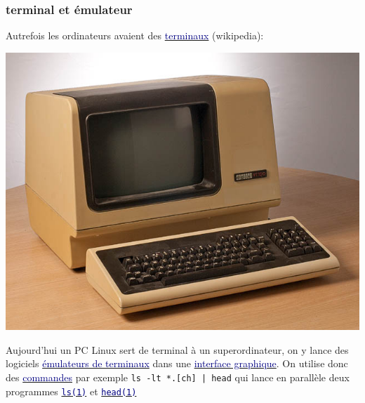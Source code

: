 \documentclass[lualatex,11pt,a4paper,svgnames,french]{beamer}
\newcommand{\clbhref}[2]{{\href{https:#1}{{\textcolor{Navy}{#2}}}}}
\newcommand{\clbman}[2]{{\href{https://man7.org/linux/man-pages/#1.html}{{\textcolor{Navy}{\texttt{#2}}}}}}
\begin{document}
\begin{frame}\frametitle{terminal et émulateur}
  Autrefois les ordinateurs avaient des \clbhref{//fr.wikipedia.org/wiki/Terminal_(informatique)}{terminaux} (wikipedia):
  \begin{center}
  \includegraphics[height=0.3\textheight]{Terminal-dec-vt100}
  \end{center}
  \bigskip
  
  Aujourd'hui un PC Linux sert de terminal à un superordinateur, on y
  lance des logiciels
  \clbhref{https://fr.wikipedia.org/wiki/émulateur_de_terminal}{émulateurs
    de terminaux} dans une
  \clbhref{https://fr.wikipedia.org/wiki/Interface_graphique}{interface
    graphique}. On utilise donc des \clbhref{https://fr.wikipedia.org/wiki/Commandes_Unix}{commandes} par exemple \texttt{ls -lt *.[ch] | head}
  qui lance en parallèle deux programmes \clbman{man1/ls.1}{ls(1)} et \clbman{man1/head.1}{head(1)}
\end{frame}
\end{document}
